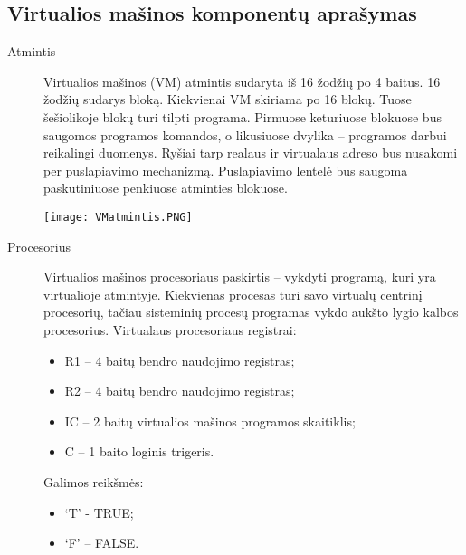 \subsection{Virtualios mašinos komponentų aprašymas}
\begin{description}
\item[Atmintis] \leavevmode 

Virtualios mašinos (VM) atmintis sudaryta iš 16 žodžių po 4 baitus. 16 žodžių sudarys bloką. Kiekvienai VM skiriama po 16 blokų. Tuose šešiolikoje blokų turi tilpti programa.
Pirmuose keturiuose blokuose bus saugomos programos komandos, o likusiuose dvylika – programos darbui reikalingi duomenys.
Ryšiai tarp realaus ir virtualaus adreso bus nusakomi per puslapiavimo mechanizmą. Puslapiavimo lentelė bus saugoma paskutiniuose penkiuose atminties blokuose.

\texttt{[image: VMatmintis.PNG]}

\item[Procesorius]  \leavevmode 
  
Virtualios mašinos procesoriaus paskirtis – vykdyti programą, kuri yra virtualioje atmintyje. Kiekvienas procesas turi savo virtualų centrinį procesorių, tačiau sisteminių procesų programas vykdo aukšto lygio kalbos procesorius. 
Virtualaus procesoriaus registrai:
\begin{itemize}
\item R1 – 4 baitų bendro naudojimo registras;
\item R2 – 4 baitų bendro naudojimo registras;
\item IC – 2 baitų virtualios mašinos programos skaitiklis;
\item C – 1 baito loginis trigeris.
\end{itemize}
Galimos reikšmės:
\begin{itemize}
\item `T' - TRUE;
\item `F' – FALSE.
\end{itemize}  
  

\end{description}
